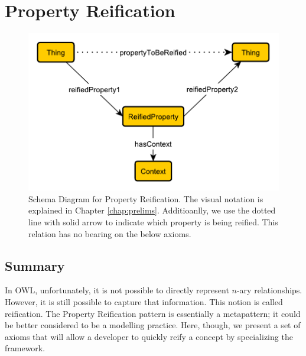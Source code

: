 \section{Property Reification}
\label{sec:Property}
\begin{figure}[h!]
\begin{center}
\includegraphics[width=.7\textwidth]{figures/reification}
\end{center}
\caption{Schema Diagram for Property Reification. The visual notation is explained in Chapter \ref{chap:prelims}. Additioanlly, we use the dotted line with solid arrow to indicate which property is being reified. This relation has no bearing on the below axioms.}
\label{fig:Property}
\end{figure}
\subsection{Summary}
\label{sum:Property}
In OWL, unfortunately, it is not possible to directly represent $n$-ary relationships. However, it is still possible to capture that information. This notion is called reification. The \textsf{Property Reification} pattern is essentially a metapattern; it could be better considered to be a modelling practice. Here, though, we present a set of axioms that will allow a developer to quickly reify a concept by specializing the framework.

